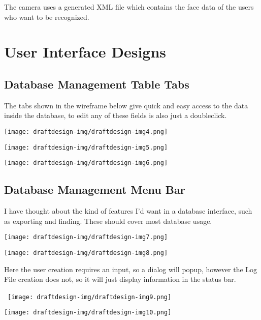 \documentclass[12pt,a4paper]{report}
\begin{document}
{\centering
The camera uses a generated XML file which contains the face data of the users who want to be recognized.
\par}

\section[User Interface Designs]{User Interface Designs}
\subsection[Database Management Table Tabs]{Database Management Table Tabs}
The tabs shown in the wireframe below give quick and easy access to the data inside the database, to edit any of these fields is also just a doubleclick.

{\centering  \texttt{[image: draftdesign-img/draftdesign-img4.png]} \par}

{\centering  \texttt{[image: draftdesign-img/draftdesign-img5.png]} \par}

{\centering  \texttt{[image: draftdesign-img/draftdesign-img6.png]} \par}

\subsection[Database Management Menu Bar]{Database Management Menu Bar}
I have thought about the kind of features I’d want in a database interface, such as exporting and finding. These should cover most database usage.

{\centering  \texttt{[image: draftdesign-img/draftdesign-img7.png]} \par}

{\centering
 \texttt{[image: draftdesign-img/draftdesign-img8.png]}  
\par}

{\centering
Here the user creation requires an input, so a dialog will popup, however the Log File creation does not, so it will just display information in the status bar.
\par}

{\centering
\  \texttt{[image: draftdesign-img/draftdesign-img9.png]} 
\par}

{\centering  \texttt{[image: draftdesign-img/draftdesign-img10.png]} \par}
\end{document}
